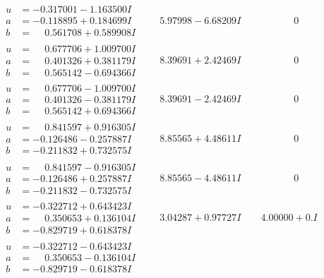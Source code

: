 \documentclass[1p]{elsarticle_modified}
\theoremstyle{definition}
\begin{document}
$$\begin{array}{c|c|c}
\begin{aligned}
u &= -0.317001 - 1.163500 I \\
a &= -0.118895 + 0.184699 I \\
b &= \phantom{-}0.561708 + 0.589908 I\end{aligned}
 & \phantom{-}5.97998 - 6.68209 I & \phantom{-0.000000 } 0 \\ \hline\begin{aligned}
u &= \phantom{-}0.677706 + 1.009700 I \\
a &= \phantom{-}0.401326 + 0.381179 I \\
b &= \phantom{-}0.565142 - 0.694366 I\end{aligned}
 & \phantom{-}8.39691 + 2.42469 I & \phantom{-0.000000 } 0 \\ \hline\begin{aligned}
u &= \phantom{-}0.677706 - 1.009700 I \\
a &= \phantom{-}0.401326 - 0.381179 I \\
b &= \phantom{-}0.565142 + 0.694366 I\end{aligned}
 & \phantom{-}8.39691 - 2.42469 I & \phantom{-0.000000 } 0 \\ \hline\begin{aligned}
u &= \phantom{-}0.841597 + 0.916305 I \\
a &= -0.126486 - 0.257887 I \\
b &= -0.211832 + 0.732575 I\end{aligned}
 & \phantom{-}8.85565 + 4.48611 I & \phantom{-0.000000 } 0 \\ \hline\begin{aligned}
u &= \phantom{-}0.841597 - 0.916305 I \\
a &= -0.126486 + 0.257887 I \\
b &= -0.211832 - 0.732575 I\end{aligned}
 & \phantom{-}8.85565 - 4.48611 I & \phantom{-0.000000 } 0 \\ \hline\begin{aligned}
u &= -0.322712 + 0.643423 I \\
a &= \phantom{-}0.350653 + 0.136104 I \\
b &= -0.829719 + 0.618378 I\end{aligned}
 & \phantom{-}3.04287 + 0.97727 I & \phantom{-}4.00000 + 0. I\phantom{ +0.000000I} \\ \hline\begin{aligned}
u &= -0.322712 - 0.643423 I \\
a &= \phantom{-}0.350653 - 0.136104 I \\
b &= -0.829719 - 0.618378 I\end{aligned}

\end{array}$$
\end{document}
